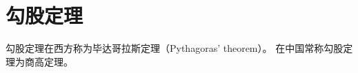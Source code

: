 \documentclass{ctexart}
\begin{document}
\section{勾股定理}
勾股定理在西方称为毕达哥拉斯定理（Pythagoras' theorem）。
在中国常称勾股定理为商高定理。

\printindex
\end{document}
